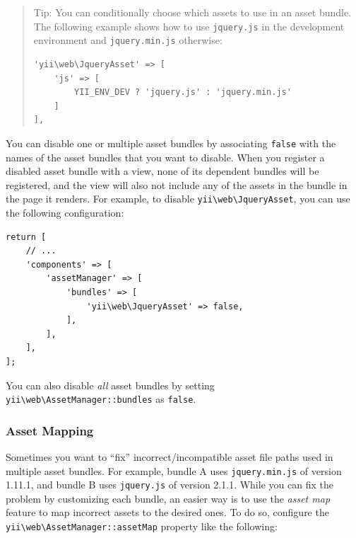 \begin{quote}Tip: You can conditionally choose which assets to use in an asset bundle. The following example shows how
to use \lstinline|jquery.js| in the development environment and \lstinline|jquery.min.js| otherwise:

\lstset{language=php}\begin{lstlisting}
'yii\web\JqueryAsset' => [
    'js' => [
        YII_ENV_DEV ? 'jquery.js' : 'jquery.min.js'
    ]
],
\end{lstlisting}
\end{quote}
You can disable one or multiple asset bundles by associating \lstinline|false| with the names of the asset bundles
that you want to disable. When you register a disabled asset bundle with a view, none of its dependent bundles
will be registered, and the view will also not include any of the assets in the bundle in the page it renders.
For example, to disable \texttt{yii{\allowbreak{}\textbackslash}web{\allowbreak{}\textbackslash}JqueryAsset}, you can use the following configuration:

\lstset{language=php}\begin{lstlisting}
return [
    // ...
    'components' => [
        'assetManager' => [
            'bundles' => [
                'yii\web\JqueryAsset' => false,
            ],
        ],
    ],
];
\end{lstlisting}
You can also disable \textit{all} asset bundles by setting \texttt{yii{\allowbreak{}\textbackslash}web{\allowbreak{}\textbackslash}AssetManager\allowbreak{}::\allowbreak{}bundles} as \lstinline|false|.

\subsubsection{Asset Mapping \label{structure-assets.md::asset-mapping}}
Sometimes you want to ``fix'' incorrect/incompatible asset file paths used in multiple asset bundles. For example,
bundle A uses \lstinline|jquery.min.js| of version 1.11.1, and bundle B uses \lstinline|jquery.js| of version 2.1.1. While you can
fix the problem by customizing each bundle, an easier way is to use the \textit{asset map} feature to map incorrect assets
to the desired ones. To do so, configure the \texttt{yii{\allowbreak{}\textbackslash}web{\allowbreak{}\textbackslash}AssetManager\allowbreak{}::\allowbreak{}assetMap} property like the following:

